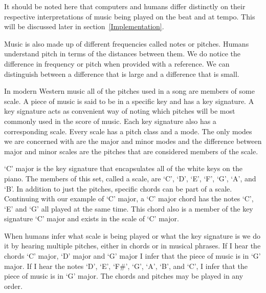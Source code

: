 \documentclass[12pt]{ucthesis}
\begin{document}
It should be noted here that computers and humans differ distinctly on their respective interpretations of music being played on the beat and at tempo. This will be discussed later in section~\ref{Implementation}.

Music is also made up of different frequencies called notes or pitches. Humans understand pitch in terms of the distances between them. We do notice the difference in frequency or pitch when provided with a reference. We can distinguish between a difference that is large and a difference that is small.

In modern Western music all of the pitches used in a song are members of some scale. A piece of music is said to be in a specific key and has a key signature. A key signature acts as convenient way of noting which pitches will be most commonly used in the score of music. Each key signature also has a corresponding scale. Every scale has a pitch class and a mode. The only modes we are concerned with are the major and minor modes and the difference between major and minor scales are the pitches that are considered members of the scale.


`C' major is the key signature that encapsulates all of the white keys on the piano. The members of this set, called a scale, are `C', `D', `E', `F', `G', `A', and `B'. In addition to just the pitches, specific chords can be part of a scale. Continuing with our example of `C' major, a `C' major chord has the notes `C', `E' and `G' all played at the same time. This chord also is a member of the key signature `C' major and exists in the scale of `C' major. 

When humans infer what scale is being played or what the key signature is we do it by hearing multiple pitches, either in chords or in musical phrases. If I hear the chords `C' major, `D' major and `G' major I infer that the piece of music is in `G' major. If I hear the notes `D', `E', `F\#', `G', `A', `B', and `C', I infer that the piece of music is in `G' major. The chords and pitches may be played in any order. 
\end{document}
